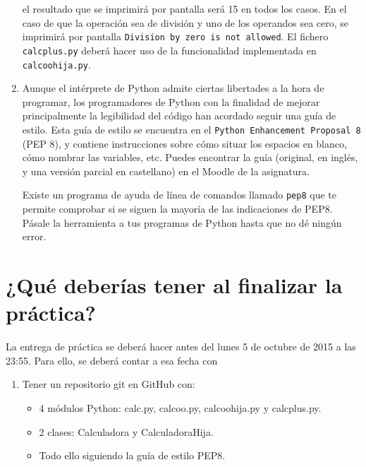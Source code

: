 \documentclass[11pt,a4paper]{article}
\newcommand{\finejercicio}{
  \begin{footnotesize}
    [Al terminar el ejercicio es recomendable hacer \texttt{commit} de los ficheros modificados]
  \end{footnotesize}
}
\newcommand{\finpractica}{
  \begin{footnotesize}
    [Al terminar la práctica, realiza un \texttt{push} para sincronizar tu repositorio GitHub]
  \end{footnotesize}
}
\renewcommand{\finejercicio}{
}
\renewcommand{\finpractica}{
}
\begin{document}
\begin{enumerate}
	el resultado que se imprimirá por pantalla será 15 en todos los casos. En el caso de que la operación sea de división y uno de los operandos sea cero, se imprimirá por pantalla \texttt{Division by zero is not allowed}. El fichero \texttt{calcplus.py} deberá hacer uso de la funcionalidad implementada en \texttt{calcoohija.py}.

\finejercicio

  \item Aunque el intérprete de Python admite ciertas libertades a la hora de programar, los programadores de Python con la finalidad de mejorar principalmente la legibilidad del código han acordado seguir una guía de estilo. Esta guía de estilo se encuentra en el \texttt{Python Enhancement Proposal 8} (PEP 8), y contiene instrucciones sobre cómo situar los espacios en blanco, cómo nombrar las variables, etc. Puedes encontrar la guía (original, en inglés, y una versión parcial en castellano) en el Moodle de la asignatura.

  Existe un programa de ayuda de línea de comandos llamado \texttt{pep8} que te permite comprobar si se siguen la mayoría de las indicaciones de PEP8. Pásale la herramienta a tus programas de Python hasta que no dé ningún error.

\finejercicio

\finpractica

\end{enumerate}

\section{¿Qué deberías tener al finalizar la práctica?}

La entrega de práctica se deberá hacer antes del lunes 5 de octubre de 2015 a las 23:55. Para ello, se deberá contar a esa fecha con


\begin{enumerate}
  \item Tener un repositorio git en GitHub con:
  \begin{itemize}
      \item 4 módulos Python: calc.py, calcoo.py, calcoohija.py y calcplus.py.
      \item 2 clases: Calculadora y CalculadoraHija.
      \item Todo ello siguiendo la guía de estilo PEP8.
  \end{itemize}
\end{enumerate}
\end{document}
